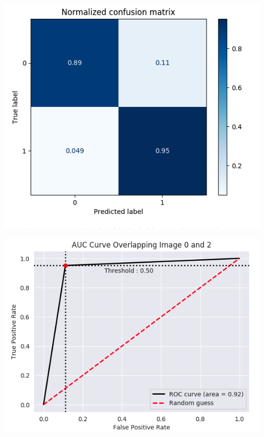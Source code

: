 \documentclass[12pt]{article}
\begin{document}
\begin{multicols*}{2}
\begin{center}
	\includegraphics[scale=0.3]{../screenshot/Overlapping/cf01.png}

	\includegraphics[scale=0.3]{../screenshot/Overlapping/roc01.png}
  \end{center}


\end{multicols*}
\end{document}
